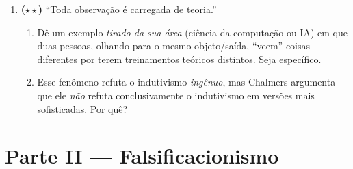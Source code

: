 \documentclass[10pt,a4paper]{extarticle}
\newcommand{\difii}{$\star\star$}
\begin{document}
\begin{enumerate}[label=\textbf{\arabic*.}, leftmargin=*]
\begin{enumerate}[label=(\alph*)]
    \item Popper, em sua defesa do falsificacionismo;
    \item o indutivista ingênuo;
    \item Kuhn, ao caracterizar a ciência normal;
    \item Lakatos, ao discutir o cinturão protetor;
    \item nenhum dos autores estudados.
\end{enumerate}

Justifique sua escolha em uma frase.

\item \textbf{(\difii)} ``Toda observação é carregada de teoria.''

\begin{enumerate}[label=(\alph*)]
    \item Dê um exemplo \emph{tirado da sua área} (ciência da computação ou IA) em que duas pessoas, olhando para o mesmo objeto/saída, ``veem'' coisas diferentes por terem treinamentos teóricos distintos. Seja específico.
    \item Esse fenômeno refuta o indutivismo \emph{ingênuo}, mas Chalmers argumenta que ele \emph{não} refuta conclusivamente o indutivismo em versões mais sofisticadas. Por quê?
\end{enumerate}

\end{enumerate}

\section*{Parte II --- Falsificacionismo}
\end{document}
